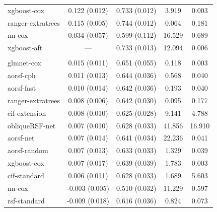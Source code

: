 \documentclass[twoside,11pt]{article}\usepackage[]{graphicx}\usepackage[]{xcolor}
\newenvironment{knitrout}{}{} %
\begin{document}
\begin{knitrout}
\begin{longtable}[t]{lcccc}
\hspace{1em}xgboost-cox & 0.122 (0.012) & 0.733 (0.012) & 3.919 & 0.003\\
\hspace{1em}ranger-extratrees & 0.115 (0.005) & 0.744 (0.012) & 0.064 & 0.181\\
\hspace{1em}nn-cox & 0.034 (0.057) & 0.599 (0.112) & 16.529 & 0.689\\
\hspace{1em}xgboost-aft & --- & 0.733 (0.013) & 12.094 & 0.006\\
\addlinespace[0.3em]
\multicolumn{5}{l}{\textit{\textbf{Monoclonal gammopathy; malignancy, n = 1384, p = 8}}}\\
\hline
\hspace{1em}glmnet-cox & 0.015 (0.011) & 0.651 (0.055) & 0.118 & 0.003\\
\hspace{1em}aorsf-cph & 0.011 (0.013) & 0.644 (0.036) & 0.568 & 0.040\\
\hspace{1em}aorsf-fast & 0.010 (0.014) & 0.642 (0.036) & 0.193 & 0.040\\
\hspace{1em}ranger-extratrees & 0.008 (0.006) & 0.642 (0.030) & 0.095 & 0.177\\
\hspace{1em}cif-extension & 0.008 (0.010) & 0.625 (0.028) & 9.141 & 4.788\\
\hspace{1em}obliqueRSF-net & 0.007 (0.010) & 0.628 (0.033) & 41.856 & 16.910\\
\hspace{1em}aorsf-net & 0.007 (0.014) & 0.641 (0.034) & 22.236 & 0.041\\
\hspace{1em}aorsf-random & 0.007 (0.013) & 0.633 (0.033) & 1.329 & 0.039\\
\hspace{1em}xgboost-cox & 0.007 (0.017) & 0.639 (0.039) & 1.783 & 0.003\\
\hspace{1em}cif-standard & 0.006 (0.011) & 0.628 (0.033) & 1.689 & 5.603\\
\hspace{1em}nn-cox & -0.003 (0.005) & 0.510 (0.032) & 11.229 & 0.597\\
\hspace{1em}rsf-standard & -0.009 (0.018) & 0.616 (0.036) & 0.824 & 0.073\\

\end{longtable}
\end{knitrout}
\end{document}
